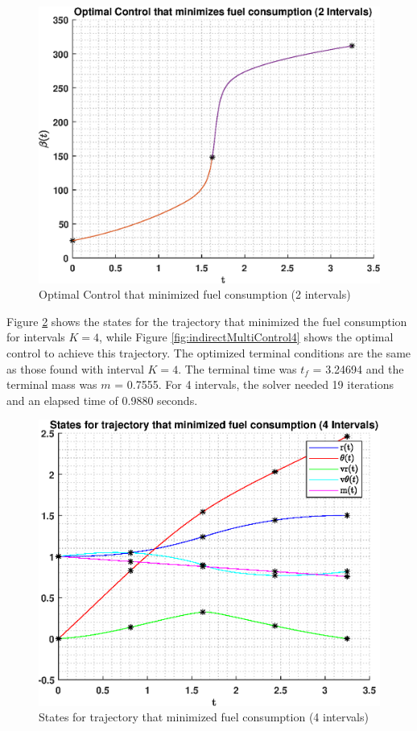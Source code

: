 \documentclass[]{article}
\begin{document}
\begin{figure}
	\centering
	\includegraphics[scale=0.75]{indirectMultiControl.eps}
	\caption{Optimal Control that minimized fuel consumption (2 intervals)}
	\label{fig:indirectMultiControl}
\end{figure}
\vspace{2mm}\newline 
Figure \ref{fig:indirectMultiStates4} shows the states for the trajectory that minimized the fuel consumption for intervals \(K = 4\), while Figure \ref{fig:indirectMultiControl4} shows the optimal control to achieve this trajectory. The optimized terminal conditions are the same as those found with interval \(K = 4\). The terminal time was \(t_f\) = 3.24694 and the terminal mass was \(m\) = 0.7555. For 4 intervals, the solver needed 19 iterations and an elapsed time of 0.9880 seconds.
\begin{figure}
	\centering
	\includegraphics[scale=0.75]{indirectMultiStates4.eps}
	\caption{States for trajectory that minimized fuel consumption (4 intervals)}
	\label{fig:indirectMultiStates4}
\end{figure}
\end{document}
